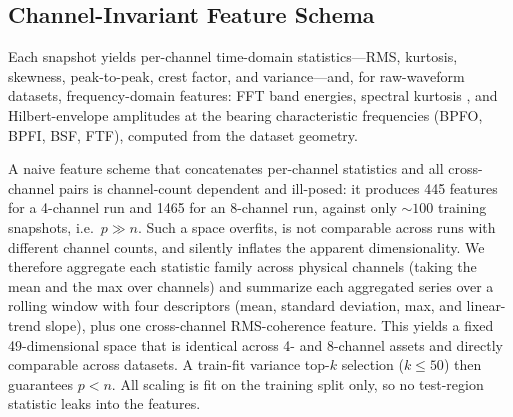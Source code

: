\documentclass[IJPHM, 2026, 0]{PHMSociety}
\begin{document}
\subsection{Channel-Invariant Feature Schema}
Each snapshot yields per-channel time-domain statistics---RMS, kurtosis, skewness, peak-to-peak, crest factor, and variance---and, for raw-waveform datasets, frequency-domain features: FFT band energies, spectral kurtosis \cite{antoni2006spectral}, and Hilbert-envelope amplitudes at the bearing characteristic frequencies (BPFO, BPFI, BSF, FTF), computed from the dataset geometry.

A naive feature scheme that concatenates per-channel statistics and all cross-channel pairs is channel-count dependent and ill-posed: it produces 445 features for a 4-channel run and 1465 for an 8-channel run, against only ${\sim}100$ training snapshots, i.e.\ $p \gg n$. Such a space overfits, is not comparable across runs with different channel counts, and silently inflates the apparent dimensionality. We therefore aggregate each statistic family across physical channels (taking the mean and the max over channels) and summarize each aggregated series over a rolling window with four descriptors (mean, standard deviation, max, and linear-trend slope), plus one cross-channel RMS-coherence feature. This yields a fixed 49-dimensional space that is identical across 4- and 8-channel assets and directly comparable across datasets. A train-fit variance top-$k$ selection ($k \le 50$) then guarantees $p < n$. All scaling is fit on the training split only, so no test-region statistic leaks into the features.
\end{document}
